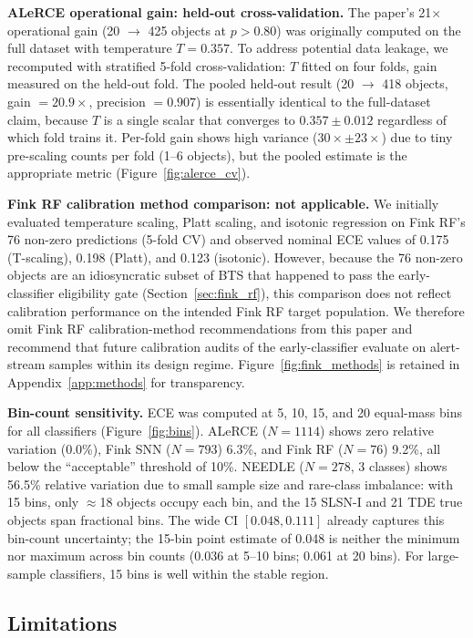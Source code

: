 \documentclass[twocolumn]{aastex631}
\begin{document}
\textbf{ALeRCE operational gain: held-out cross-validation.} The paper's 21$\times$ operational gain (20 $\to$ 425 objects at $p > 0.80$) was originally computed on the full dataset with temperature $T = 0.357$. To address potential data leakage, we recomputed with stratified 5-fold cross-validation: $T$ fitted on four folds, gain measured on the held-out fold. The pooled held-out result (20 $\to$ 418 objects, gain $= 20.9\times$, precision $= 0.907$) is essentially identical to the full-dataset claim, because $T$ is a single scalar that converges to $0.357 \pm 0.012$ regardless of which fold trains it. Per-fold gain shows high variance ($30\times \pm 23\times$) due to tiny pre-scaling counts per fold (1--6 objects), but the pooled estimate is the appropriate metric (Figure~\ref{fig:alerce_cv}).

\textbf{Fink RF calibration method comparison: not applicable.} We initially evaluated temperature scaling, Platt scaling, and isotonic regression on Fink RF's 76 non-zero predictions (5-fold CV) and observed nominal ECE values of 0.175 (T-scaling), 0.198 (Platt), and 0.123 (isotonic). However, because the 76 non-zero objects are an idiosyncratic subset of BTS that happened to pass the early-classifier eligibility gate (Section~\ref{sec:fink_rf}), this comparison does not reflect calibration performance on the intended Fink RF target population. We therefore omit Fink RF calibration-method recommendations from this paper and recommend that future calibration audits of the early-classifier evaluate on alert-stream samples within its design regime. Figure~\ref{fig:fink_methods} is retained in Appendix~\ref{app:methods} for transparency.

\textbf{Bin-count sensitivity.} ECE was computed at 5, 10, 15, and 20 equal-mass bins for all classifiers (Figure~\ref{fig:bins}). ALeRCE ($N = 1114$) shows zero relative variation (0.0\%), Fink SNN ($N = 793$) 6.3\%, and Fink RF ($N = 76$) 9.2\%, all below the ``acceptable'' threshold of 10\%. NEEDLE ($N = 278$, 3 classes) shows 56.5\% relative variation due to small sample size and rare-class imbalance: with 15 bins, only $\approx$18 objects occupy each bin, and the 15 SLSN-I and 21 TDE true objects span fractional bins. The wide CI $[0.048, 0.111]$ already captures this bin-count uncertainty; the 15-bin point estimate of 0.048 is neither the minimum nor maximum across bin counts (0.036 at 5--10 bins; 0.061 at 20 bins). For large-sample classifiers, 15 bins is well within the stable region.

\subsection{Limitations}
\label{sec:limitations}
\end{document}

